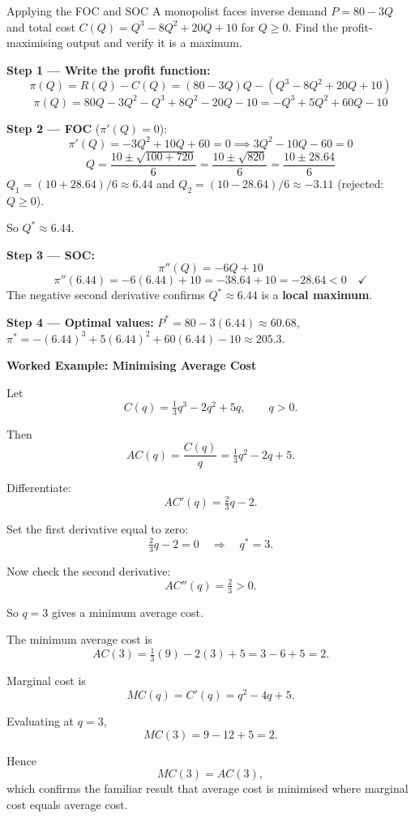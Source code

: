 \documentclass[12pt, a4paper]{article}
\theoremstyle{definition}
\begin{document}
\begin{exbox}{Applying the FOC and SOC}
A monopolist faces inverse demand $P = 80 - 3Q$ and total cost
$C(Q) = Q^3 - 8Q^2 + 20Q + 10$ for $Q \geq 0$.
Find the profit-maximising output and verify it is a maximum.

\textbf{Step 1 --- Write the profit function:}
\[
  \pi(Q) = R(Q) - C(Q) = (80-3Q)Q - (Q^3-8Q^2+20Q+10)
\]
\[
  \pi(Q) = 80Q - 3Q^2 - Q^3 + 8Q^2 - 20Q - 10
         = -Q^3 + 5Q^2 + 60Q - 10
\]

\textbf{Step 2 --- FOC} ($\pi'(Q)=0$):
\[
  \pi'(Q) = -3Q^2 + 10Q + 60 = 0
  \implies 3Q^2 - 10Q - 60 = 0
\]
\[
  Q = \frac{10 \pm \sqrt{100 + 720}}{6}
    = \frac{10 \pm \sqrt{820}}{6}
    = \frac{10 \pm 28.64}{6}
\]
$Q_1 = (10+28.64)/6 \approx 6.44$ \quad and \quad
$Q_2 = (10-28.64)/6 \approx -3.11$ (rejected: $Q \geq 0$).

So $Q^* \approx 6.44$.

\textbf{Step 3 --- SOC:}
\[
  \pi''(Q) = -6Q + 10
\]
\[
  \pi''(6.44) = -6(6.44)+10 = -38.64+10 = -28.64 < 0 \quad \checkmark
\]
The negative second derivative confirms $Q^* \approx 6.44$ is a
\textbf{local maximum}.

\textbf{Step 4 --- Optimal values:}
$P^* = 80-3(6.44) \approx 60.68$, \quad
$\pi^* = -(6.44)^3+5(6.44)^2+60(6.44)-10 \approx 205.3$.
\end{exbox}

\begin{center}
\textbf{Worked Example: Minimising Average Cost}
\end{center}

Let
\[
C(q)=\tfrac{1}{3}q^3-2q^2+5q, \qquad q>0.
\]

Then
\[
AC(q)=\frac{C(q)}{q}=\tfrac{1}{3}q^2-2q+5.
\]

Differentiate:
\[
AC'(q)=\tfrac{2}{3}q-2.
\]

Set the first derivative equal to zero:
\[
\tfrac{2}{3}q-2=0
\quad \Rightarrow \quad
q^*=3.
\]

Now check the second derivative:
\[
AC''(q)=\tfrac{2}{3}>0.
\]

So $q=3$ gives a minimum average cost.

The minimum average cost is
\[
AC(3)=\tfrac{1}{3}(9)-2(3)+5=3-6+5=2.
\]

Marginal cost is
\[
MC(q)=C'(q)=q^2-4q+5.
\]

Evaluating at $q=3$,
\[
MC(3)=9-12+5=2.
\]

Hence
\[
MC(3)=AC(3),
\]
which confirms the familiar result that average cost is minimised where marginal cost equals average cost.
\end{document}
